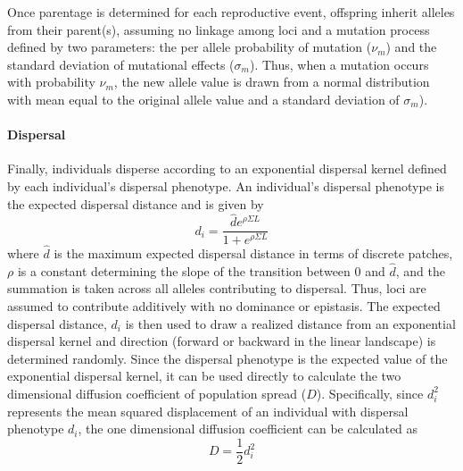 \documentclass[11pt]{article}
\begin{document}
Once parentage is determined for each reproductive event, offspring inherit alleles from their parent(s), assuming no linkage among loci and a mutation process defined by two parameters: the per allele probability of mutation ($\nu_{m}$) and the standard deviation of mutational effects ($\sigma_{m}$). Thus, when a mutation occurs with probability $\nu_{m}$, the new allele value is drawn from a normal distribution with mean equal to the original allele value and a standard deviation of $\sigma_{m}$).

\paragraph{Dispersal}
Finally, individuals disperse according to an exponential dispersal kernel defined by each individual's dispersal phenotype. An individual's dispersal phenotype is the expected dispersal distance and is given by
\begin{equation}
d_{i} = \frac{\hat{d} e^{\rho\Sigma L}}{1+e^{\rho\Sigma L}} 
\end{equation}
where $\hat{d}$ is the maximum expected dispersal distance in terms of discrete patches, $\rho$ is a constant determining the slope of the transition between $0$ and $\hat{d}$, and the summation is taken across all alleles contributing to dispersal. Thus, loci are assumed to contribute additively with no dominance or epistasis. The expected dispersal distance, $d_{i}$ is then used to draw a realized distance from an exponential dispersal kernel and direction (forward or backward in the linear landscape) is determined randomly. Since the dispersal phenotype is the expected value of the exponential dispersal kernel, it can be used directly to calculate the two dimensional diffusion coefficient of population spread ($D$). Specifically, since $d_{i}^{2}$ represents the mean squared displacement of an individual with dispersal phenotype $d_{i}$, the one dimensional diffusion coefficient can be calculated as
\begin{equation}
D = \frac{1}{2}d_{i}^{2}
\end{equation}



\end{document}
